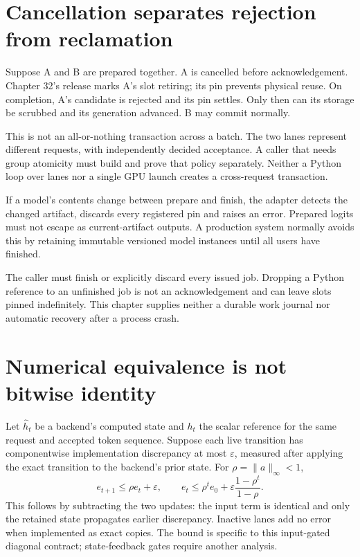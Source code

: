\section{Cancellation separates rejection from reclamation}
\label{evod34:cancellation}
Suppose A and B are prepared together. A is cancelled before acknowledgement.
Chapter 32's release marks A's slot retiring; its pin prevents physical reuse.
On completion, A's candidate is rejected and its pin settles. Only then can
its storage be scrubbed and its generation advanced. B may commit normally.


This is not an all-or-nothing transaction across a batch. The two lanes
represent different requests, with independently decided acceptance.
A caller that needs group atomicity must build and prove that policy
separately. Neither a Python loop over lanes nor a single GPU launch creates
a cross-request transaction.

If a model's contents change between prepare and finish, the adapter detects
the changed artifact, discards every registered pin and raises an error.
Prepared logits must not escape as current-artifact outputs. A production
system normally avoids this by retaining immutable versioned model instances
until all users have finished.

The caller must finish or explicitly discard every issued job. Dropping a
Python reference to an unfinished job is not an acknowledgement and can leave
slots pinned indefinitely. This chapter supplies neither a durable work
journal nor automatic recovery after a process crash.

\section{Numerical equivalence is not bitwise identity}
\label{evod34:numerics}
Let $\widehat h_t$ be a backend's computed state and $h_t$ the scalar reference
for the same request and accepted token sequence. Suppose each live transition
has componentwise implementation discrepancy at most $\varepsilon$,
measured after applying the exact transition to the backend's prior state.
For $\rho=\|a\|_\infty<1$,
\[
 e_{t+1}\le \rho e_t+\varepsilon,\qquad
 e_t\le \rho^t e_0+\varepsilon\frac{1-\rho^t}{1-\rho}.
\]
This follows by subtracting the two updates: the input term is identical
and only the retained state propagates earlier discrepancy. Inactive lanes
add no error when implemented as exact copies. The bound is specific to this
input-gated diagonal contract; state-feedback gates require another analysis.

